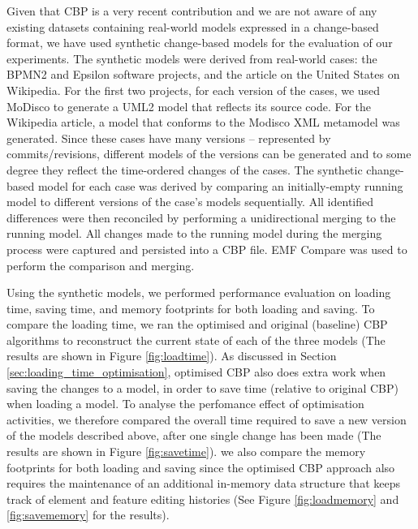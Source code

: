 \documentclass{llncs}
\begin{document}
{    Given that CBP is a very recent contribution and we are not aware of any existing datasets containing real-world models expressed in a change-based format, we have used synthetic change-based models for the evaluation of our experiments. The synthetic models were derived from real-world cases: the BPMN2 \cite{eclipse2017bpmn2,eclipse2018bpmn2git} and Epsilon \cite{eclipse2017epsilon,eclipse2018epsilongit} software projects, and the article on the United States \cite{wikipedia2018us} on Wikipedia. For the first two projects, for each version of the cases, we used MoDisco \cite{DBLP:journals/infsof/BruneliereCDM14} to generate a UML2 \cite{eclipse2017uml2} model that reflects its source code. For the Wikipedia article, a model that conforms to the Modisco XML metamodel \cite{eclipse2018modiscoxml} was generated. Since these cases have many versions -- represented by commits/revisions, different models of the versions can be generated and to some degree they reflect the time-ordered changes of the cases. The synthetic change-based model for each case was derived by comparing an initially-empty running model to different versions of the case's models sequentially. All identified differences were then reconciled by performing a unidirectional merging to the running model. All changes made to the running model during the merging process were captured and persisted into a CBP file. EMF Compare was used \cite{eclipse2017compare} to perform the comparison and merging.
    
    Using the synthetic models, we performed performance evaluation on loading time, saving time, and memory footprints for both loading and saving. To compare the loading time, we ran the optimised and original (baseline) CBP algorithms to reconstruct the current state of each of the three models (The results are shown in Figure \ref{fig:loadtime}). As discussed in Section \ref{sec:loading_time_optimisation}, optimised CBP also does extra work when saving the changes to a model, in order to save time (relative to original CBP) when loading a model. To analyse the perfomance effect of optimisation activities, we therefore compared the overall time required to save a new version of the models described above, after one single change has been made (The results are shown in Figure \ref{fig:savetime}). we also compare the memory footprints for both loading and saving since the optimised CBP approach also requires the maintenance of an additional in-memory data structure that keeps track of element and feature editing histories (See Figure \ref{fig:loadmemory} and \ref{fig:savememory} for the results). 
    
}
\end{document}

